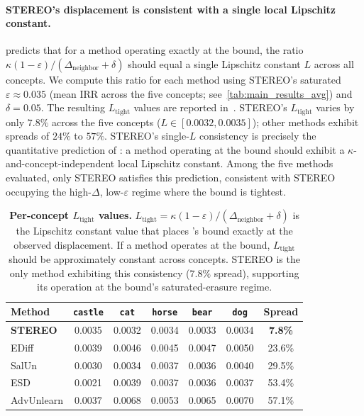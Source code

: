 \paragraph{STEREO's displacement is consistent with a single local Lipschitz constant.}
 predicts that for a method operating exactly at the bound, the ratio $\kappa(1-\varepsilon)/(\Delta_{\text{neighbor}} + \delta)$ should equal a single Lipschitz constant $L$ across all concepts. We compute this ratio for each method using STEREO's saturated $\varepsilon \approx 0.035$ (mean IRR across the five concepts; see~\cref{tab:main_results_avg})  and $\delta = 0.05$. The resulting $L_{\text{tight}}$ values are reported in~. STEREO's $L_{\text{tight}}$ varies by only $7.8\%$ across the five concepts ($L \in [0.0032, 0.0035]$); other methods exhibit spreads of $24\%$ to $57\%$. STEREO's single-$L$ consistency is precisely the quantitative prediction of : a method operating at the bound should exhibit a $\kappa$-and-concept-independent local Lipschitz constant. Among the five methods evaluated, only STEREO satisfies this prediction, consistent with STEREO occupying the high-$\Delta$, low-$\varepsilon$ regime where the bound is tightest.

\begin{table}[h]
\centering
\small
\setlength{\tabcolsep}{6pt}
\begin{tabular}{lcccccc}
\toprule
\textbf{Method} & \texttt{castle} & \texttt{cat} & \texttt{horse} & \texttt{bear} & \texttt{dog} & Spread \\
\midrule
\textbf{STEREO} & 0.0035 & 0.0032 & 0.0034 & 0.0033 & 0.0034 & \textbf{7.8\%} \\
EDiff           & 0.0039 & 0.0046 & 0.0045 & 0.0047 & 0.0050 & 23.6\% \\
SalUn           & 0.0030 & 0.0034 & 0.0037 & 0.0036 & 0.0040 & 29.5\% \\
ESD             & 0.0021 & 0.0039 & 0.0037 & 0.0036 & 0.0037 & 53.4\% \\
AdvUnlearn      & 0.0037 & 0.0068 & 0.0053 & 0.0065 & 0.0070 & 57.1\% \\
\bottomrule
\end{tabular}
\caption{\textbf{Per-concept $L_{\text{tight}}$ values.} $L_{\text{tight}} = \kappa(1-\varepsilon)/(\Delta_{\text{neighbor}} + \delta)$ is the Lipschitz constant value that places 's bound exactly at the observed displacement. If a method operates at the bound, $L_{\text{tight}}$ should be approximately constant across concepts. STEREO is the only method exhibiting this consistency ($7.8\%$ spread), supporting its operation at the bound's saturated-erasure regime.}
\label{tab:l_tight}
\end{table}

